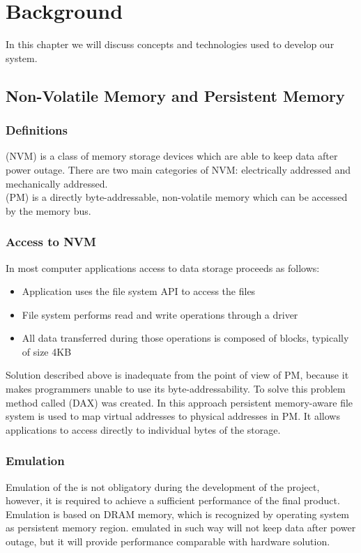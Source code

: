 \chapter{Background}

In this chapter we will discuss concepts and technologies used to develop our system.

\section{Non-Volatile Memory and Persistent Memory}
    
    \subsection{Definitions}
        \NVM (NVM) is a class of memory storage devices which are able to keep data after power outage.
        There are two main categories of NVM: electrically addressed and mechanically addressed.\\
        \PM (PM) is a directly byte-addressable, non-volatile memory which can be accessed by the memory bus. %
    
    \subsection{Access to NVM \cite{PmemAccess}}
        In most computer applications access to data storage proceeds as follows:
        \begin{itemize}
            \item Application uses the file system API to access the files
            \item File system performs read and write operations through a driver
            \item All data transferred during those operations is composed of blocks, typically of size 4KB
        \end{itemize}
        Solution described above is inadequate from the point of view of PM, because it makes programmers unable to use its byte-addressability. %
        To solve this problem method called \DAX (DAX) was created.
        In this approach persistent memory-aware file system is used to map virtual addresses to physical addresses in PM. 
        It allows applications to access directly to individual bytes of the storage.
      
    \subsection{Emulation \cite{PmemEmulation}}
        Emulation of the \PM is not obligatory during the development of the project, however, it is required to achieve a sufficient performance of the final product. 
        Emulation is based on DRAM memory, which is recognized by operating system as persistent memory region.
        \PM emulated in such way will not keep data after power outage, but it will provide performance comparable with hardware solution.
        
